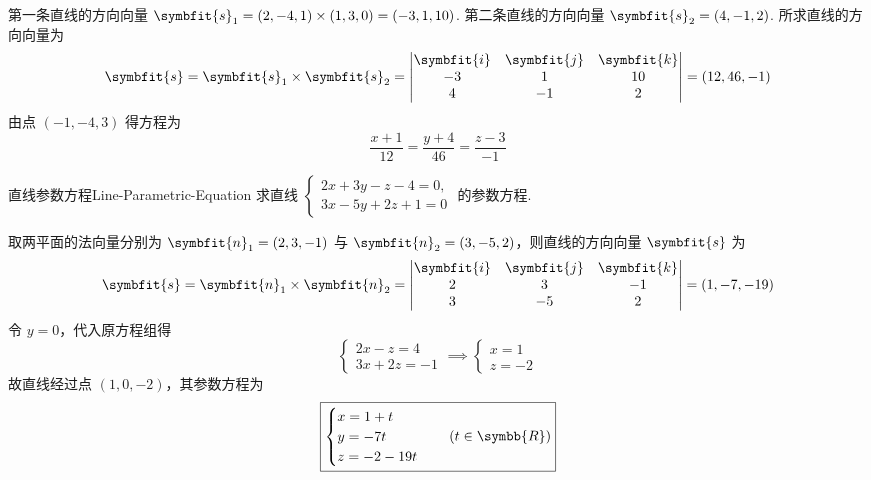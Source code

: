 \begin{solution}
    第一条直线的方向向量 $\symbfit{s}_1 = (2, -4, 1) \times (1, 3, 0) = (-3, 1, 10)$. 第二条直线的方向向量 $\symbfit{s}_2 = (4, -1, 2)$.
    所求直线的方向向量为
    \begin{equation}
        \symbfit{s} = \symbfit{s}_1 \times \symbfit{s}_2 =
        \begin{vmatrix}
            \symbfit{i} & \symbfit{j} & \symbfit{k} \\
            -3          & 1           & 10          \\
            4           & -1          & 2
        \end{vmatrix} = (12, 46, -1)
    \end{equation}
    由点 $(-1, -4, 3)$ 得方程为
    \begin{equation}
        \boxed{\frac{x+1}{12} = \frac{y+4}{46} = \frac{z-3}{-1}}
    \end{equation}
\end{solution}


\begin{problem}{直线参数方程}{Line-Parametric-Equation}
    求直线 $\begin{cases} 2x + 3y - z - 4 = 0, \\ 3x - 5y + 2z + 1 = 0 \end{cases}$ 的参数方程.
\end{problem}

\begin{solution}
    取两平面的法向量分别为 $\symbfit{n}_1 = (2, 3, -1)$ 与 $\symbfit{n}_2 = (3, -5, 2)$，则直线的方向向量 $\symbfit{s}$ 为
    \begin{equation}
        \symbfit{s} = \symbfit{n}_1 \times \symbfit{n}_2 = \begin{vmatrix} \symbfit{i} & \symbfit{j} & \symbfit{k} \\ 2 & 3 & -1 \\ 3 & -5 & 2 \end{vmatrix} = (1, -7, -19)
    \end{equation}
    令 $y = 0$，代入原方程组得
    \begin{equation}
        \begin{cases} 2x - z = 4 \\ 3x + 2z = -1 \end{cases} \implies \begin{cases} x = 1 \\ z = -2 \end{cases}
    \end{equation}
    故直线经过点 $(1, 0, -2)$，其参数方程为
    \begin{equation}
        \boxed{\begin{cases} x = 1 + t \\ y = -7t \\ z = -2 - 19t \end{cases} \quad (t \in \symbb{R})}
    \end{equation}
\end{solution}

